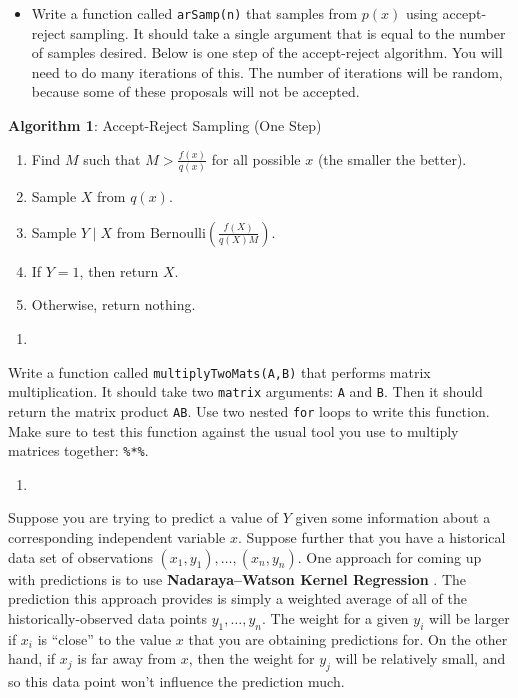 \documentclass[
  12pt,
  krantz2]{krantz}
\providecommand{\tightlist}{%
  \setlength{\itemsep}{0pt}\setlength{\parskip}{0pt}}
\begin{document}
\begin{itemize}
\tightlist
\item
  Write a function called \texttt{arSamp(n)} that samples from \(p(x)\) using accept-reject sampling. It should take a single argument that is equal to the number of samples desired. Below is one step of the accept-reject algorithm. You will need to do many iterations of this. The number of iterations will be random, because some of these proposals will not be accepted.
\end{itemize}

\textbf{Algorithm 1}: Accept-Reject Sampling (One Step)

\begin{enumerate}
\def\labelenumi{\roman{enumi}.}
\tightlist
\item
  Find \(M\) such that \(M > \frac{f(x)}{q(x)}\) for all possible \(x\) (the smaller the better).
\item
  Sample \(X\) from \(q(x)\).
\item
  Sample \(Y \mid X\) from \(\text{Bernoulli}\left(\frac{f(X)}{q(X)M}\right)\).
\item
  If \(Y = 1\), then return \(X\).
\item
  Otherwise, return nothing.
\end{enumerate}

\begin{enumerate}
\def\labelenumi{\arabic{enumi}.}
\setcounter{enumi}{2}
\tightlist
\item
\end{enumerate}

Write a function called \texttt{multiplyTwoMats(A,B)} that performs matrix multiplication. It should take two \texttt{matrix} arguments: \texttt{A} and \texttt{B}. Then it should return the matrix product \texttt{AB}. Use two nested \texttt{for} loops to write this function. Make sure to test this function against the usual tool you use to multiply matrices together: \texttt{\%*\%}.

\begin{enumerate}
\def\labelenumi{\arabic{enumi}.}
\setcounter{enumi}{3}
\tightlist
\item
\end{enumerate}

Suppose you are trying to predict a value of \(Y\) given some information about a corresponding independent variable \(x\). Suppose further that you have a historical data set of observations \((x_1, y_1), \ldots, (x_n,y_n)\). One approach for coming up with predictions is to use \textbf{Nadaraya--Watson Kernel Regression} \citep{Nadaraya} \citep{Watson}. The prediction this approach provides is simply a weighted average of all of the historically-observed data points \(y_1, \ldots, y_n\). The weight for a given \(y_i\) will be larger if \(x_i\) is ``close'' to the value \(x\) that you are obtaining predictions for. On the other hand, if \(x_j\) is far away from \(x\), then the weight for \(y_j\) will be relatively small, and so this data point won't influence the prediction much.
\end{document}
